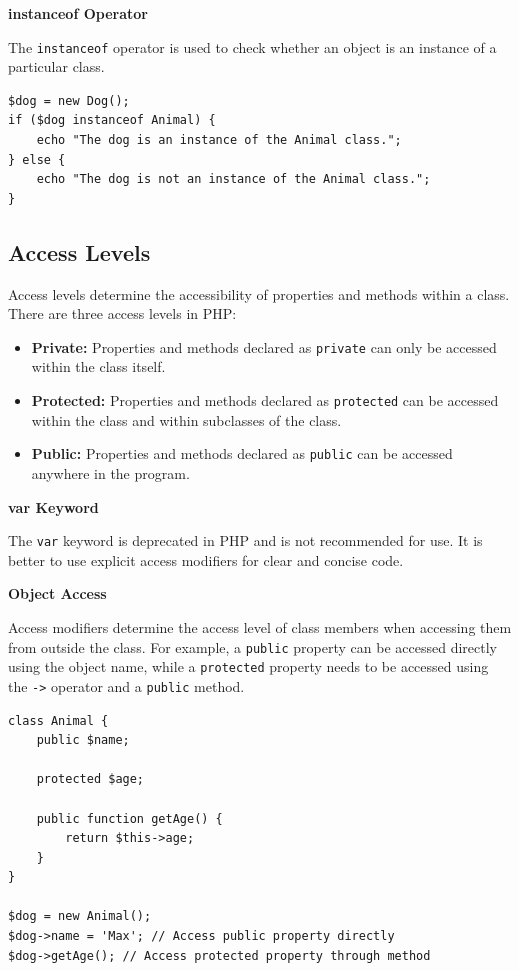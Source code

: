 \documentclass[11pt]{article}
\begin{document}
\textbf{instanceof Operator}

The \texttt{instanceof} operator is used to check whether an object is an
instance of a particular class.

\begin{verbatim}
$dog = new Dog();
if ($dog instanceof Animal) {
    echo "The dog is an instance of the Animal class.";
} else {
    echo "The dog is not an instance of the Animal class.";
}
\end{verbatim}

\subsection{\textbf{Access Levels}}
\label{sec:orgd996984}
Access levels determine the accessibility of properties and methods
within a class. There are three access levels in PHP:

\begin{itemize}
\item \textbf{Private:} Properties and methods declared as \texttt{private} can only be
accessed within the class itself.

\item \textbf{Protected:} Properties and methods declared as \texttt{protected} can be
accessed within the class and within subclasses of the class.

\item \textbf{Public:} Properties and methods declared as \texttt{public} can be accessed
anywhere in the program.
\end{itemize}

\textbf{var Keyword}

The \texttt{var} keyword is deprecated in PHP and is not recommended for use.
It is better to use explicit access modifiers for clear and concise
code.

\textbf{Object Access}

Access modifiers determine the access level of class members when
accessing them from outside the class. For example, a \texttt{public} property
can be accessed directly using the object name, while a \texttt{protected}
property needs to be accessed using the \texttt{->} operator and a \texttt{public}
method.

\begin{verbatim}
class Animal {
    public $name;

    protected $age;

    public function getAge() {
        return $this->age;
    }
}

$dog = new Animal();
$dog->name = 'Max'; // Access public property directly
$dog->getAge(); // Access protected property through method
\end{verbatim}
\end{document}
